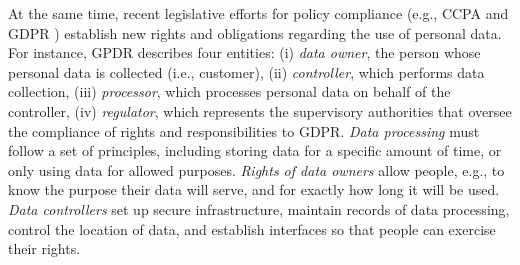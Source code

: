 At the same time, recent legislative efforts for policy compliance (e.g., CCPA \cite{ccpa} and GDPR \cite{gdpr}) %
establish new rights and obligations regarding the use of personal data.
For instance, GPDR \cite{gdpr, shastrivldb2020} 
describes four entities: (i) \textit{data owner}, the person whose personal data is collected (i.e., customer), (ii) \textit{controller}, which performs data collection, (iii) \textit{processor}, which processes personal data on behalf of the controller, (iv) \textit{regulator}, which represents the supervisory authorities that oversee the compliance of rights and responsibilities to GDPR.
\emph{Data processing} must follow a set of principles, including storing data for a specific amount of time, or only using data for allowed purposes.
\emph{Rights of data owners} allow people, e.g., to know the purpose their data will serve, and for exactly how long it will be used. %
\emph{Data controllers} set up secure infrastructure, maintain records of data processing, control the location of data, and establish interfaces so that people can exercise their rights.


